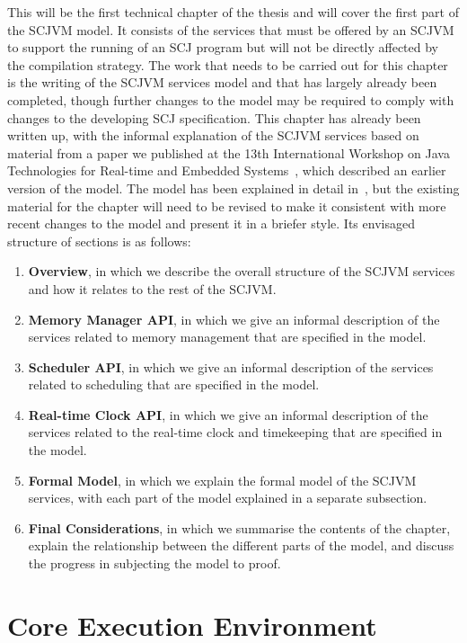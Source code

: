 \documentclass[a4paper,10pt]{report}
\let\olditem\item
\renewcommand{\item}[1][]{\olditem{\bfseries #1}}
\begin{document}
This will be the first technical chapter of the thesis and will cover
the first part of the SCJVM model.
It consists of the services that must be offered by an SCJVM to
support the running of an SCJ program but will not be directly
affected by the compilation strategy.
The work that needs to be carried out for this chapter is the writing
of the SCJVM services model and that has largely already been
completed, though further changes to the model may be required to
comply with changes to the developing SCJ specification.
This chapter has already been written up, with the informal
explanation of the SCJVM services based on material from a paper we
published at the 13th International Workshop on Java Technologies for
Real-time and Embedded Systems~\cite{baxter2015a}, which described an
earlier version of the model.
The model has been explained in detail
in~\cite{baxter2016draftthesis}, but the existing material for the
chapter will need to be revised to make it consistent with more recent
changes to the model and present it in a briefer style.
Its envisaged structure of sections is as follows:
\begin{enumerate}
\item[Overview], in which we describe the overall structure of the
  SCJVM services and how it relates to the rest of the SCJVM.
\item[Memory Manager API], in which we give an informal description of
  the services related to memory management that are specified in the
  model.
\item[Scheduler API], in which we give an informal description of the
  services related to scheduling that are specified in the model.
\item[Real-time Clock API], in which we give an informal description
  of the services related to the real-time clock and timekeeping that
  are specified in the model.
\item[Formal Model], in which we explain the formal model of the SCJVM
  services, with each part of the model explained in a separate
  subsection.
\item[Final Considerations], in which we summarise the contents of the
  chapter, explain the relationship between the different parts of the
  model, and discuss the progress in subjecting the model to proof.
\end{enumerate} 

\section{Core Execution Environment}
\end{document}
